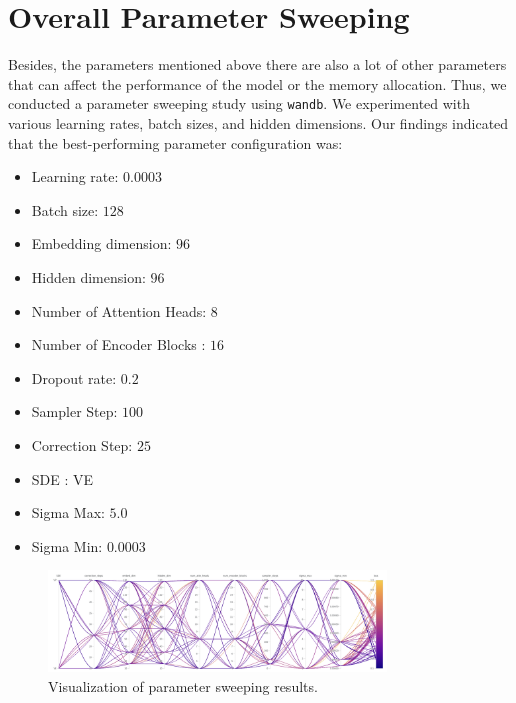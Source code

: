 \section{Overall Parameter Sweeping}
Besides, the parameters mentioned above there are also a lot of other parameters that can affect the performance of the model or the memory allocation. Thus, we conducted a parameter sweeping study using \texttt{wandb}. We experimented with various learning rates, batch sizes, and hidden dimensions. Our findings indicated that the best-performing parameter configuration was:
\begin{itemize}
    \item Learning rate: $0.0003$
    \item Batch size: $128$
    \item Embedding dimension: $96$
    \item Hidden dimension: $96$
    \item Number of Attention Heads: $8$
    \item Number of Encoder Blocks : $16$
    \item Dropout rate: $0.2$
    \item Sampler Step: $100$
    \item Correction Step: $25$
    \item SDE : VE
    \item Sigma Max: $5.0$
    \item Sigma Min: $0.0003$
\end{itemize}

\begin{figure}[h!]
    \centering
    \includegraphics[width=0.8\textwidth]{Figures/other_sweep.png}
    \caption{Visualization of parameter sweeping results.}
\end{figure}



